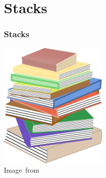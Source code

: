 \section{Stacks}
\label{sec:stacks}

\begin{frame}
	\frametitle{Stacks}
	\begin{center}
		\includegraphics[width=0.4\textwidth]{figures/stack_of_books.png}\\
		\hspace*{15pt}\hbox{\scriptsize Image from }
	\end{center}
\end{frame}

